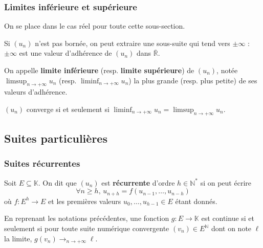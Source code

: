 	\subsubsection{Limites inférieure et supérieure}


	On se place dans le cas réel pour toute cette sous-section.

	\begin{lemma}
		Si $(u_n)$ n'est pas bornée, on peut extraire une sous-suite qui tend vers $\pm \infty$ : $\pm \infty$ est une valeur d'adhérence de $(u_n)$ dans $\overline{\mathbb{R}}$.
	\end{lemma}

	\begin{definition}
		On appelle \textbf{limite inférieure} (resp. \textbf{limite supérieure}) de $(u_n)$, notée $\limsup_{n \rightarrow +\infty} u_n$ (resp. $\liminf_{n \rightarrow +\infty} u_n$) la plus grande (resp. plus petite) de ses valeurs d'adhérence.
	\end{definition}


	\begin{proposition}
		$(u_n)$ converge si et seulement si $\liminf_{n \rightarrow +\infty} u_n = \limsup_{n \rightarrow +\infty} u_n$.
	\end{proposition}

	\subsection{Suites particulières}

	\subsubsection{Suites récurrentes}


	\begin{definition}
		Soit $E \subseteq \mathbb{K}$. On dit que $(u_n)$ est \textbf{récurrente} d'ordre $h \in \mathbb{N}^*$ si on peut écrire
		\[ \forall n \geq h, \, u_{n+h} = f(u_{n-1}, \dots, u_{n-h}) \tag{$*$} \]
		où $f : E^h \rightarrow E$ et les premières valeurs $u_0, \dots, u_{h-1} \in E$ étant donnés.
	\end{definition}


	\begin{theorem}
		En reprenant les notations précédentes, une fonction $g : E \rightarrow \mathbb{K}$ est continue si et seulement si pour toute suite numérique convergente $(v_n) \in E^{\mathbb{N}}$ dont on note $\ell$ la limite, $g(v_n) \longrightarrow_{n \rightarrow +\infty} \ell$.
	\end{theorem}

